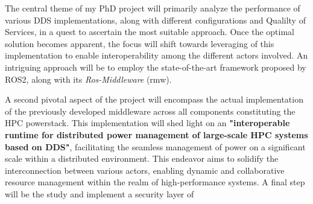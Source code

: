 
The central theme of my PhD project will primarily analyze the performance of various DDS implementations, along with different configurations and Qualilty of Services, in a quest to ascertain the most suitable approach. Once the optimal solution becomes apparent, the focus will shift towards leveraging of this implementation to enable interoperability among the different actors involved. An intriguing approach will be to employ the state-of-the-art framework proposed by ROS2, along with its \emph{Ros-Middleware} (rmw).

A second pivotal aspect of the project will encompass the actual implementation of the previously developed middleware across all components constituting the HPC powerstack. This implementation will shed light on an \textbf{"interoperable runtime for distributed power management of large-scale HPC systems based on DDS"}, facilitating the seamless management of power on a significant scale within a distributed environment. This endeavor aims to solidify the interconnection between various actors, enabling dynamic and collaborative resource management within the realm of high-performance systems.
A final step will be the study and implement a security layer of 

